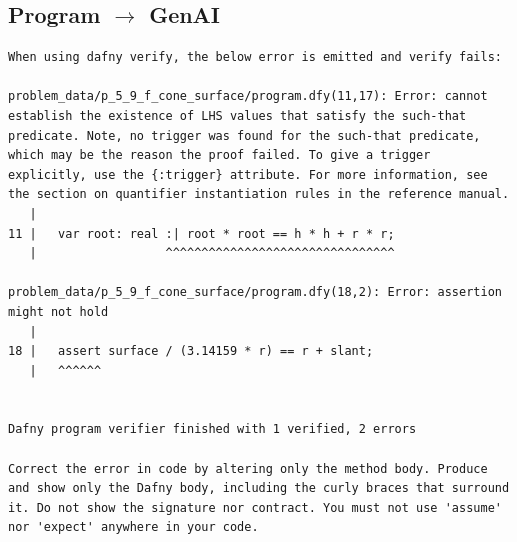 \documentclass{article}
\begin{document}
\subsection*{Program $\rightarrow$ GenAI}
\begin{lstlisting}
When using dafny verify, the below error is emitted and verify fails:

problem_data/p_5_9_f_cone_surface/program.dfy(11,17): Error: cannot establish the existence of LHS values that satisfy the such-that predicate. Note, no trigger was found for the such-that predicate, which may be the reason the proof failed. To give a trigger explicitly, use the {:trigger} attribute. For more information, see the section on quantifier instantiation rules in the reference manual.
   |
11 |   var root: real :| root * root == h * h + r * r;
   |                  ^^^^^^^^^^^^^^^^^^^^^^^^^^^^^^^^

problem_data/p_5_9_f_cone_surface/program.dfy(18,2): Error: assertion might not hold
   |
18 |   assert surface / (3.14159 * r) == r + slant;
   |   ^^^^^^


Dafny program verifier finished with 1 verified, 2 errors

Correct the error in code by altering only the method body. Produce and show only the Dafny body, including the curly braces that surround it. Do not show the signature nor contract. You must not use 'assume' nor 'expect' anywhere in your code.
\end{lstlisting}
\end{document}

